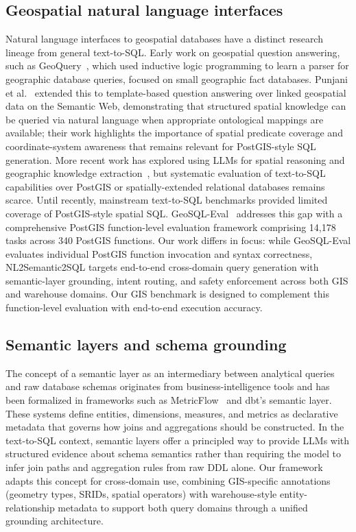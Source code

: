 \documentclass[11pt]{article}
\begin{document}
\subsection{Geospatial natural language interfaces}

Natural language interfaces to geospatial databases have a distinct research lineage from general text-to-SQL. Early work on geospatial question answering, such as GeoQuery~\cite{zelle1996geoquery}, which used inductive logic programming to learn a parser for geographic database queries, focused on small geographic fact databases. Punjani et al.~\cite{punjani2018geospatial} extended this to template-based question answering over linked geospatial data on the Semantic Web, demonstrating that structured spatial knowledge can be queried via natural language when appropriate ontological mappings are available; their work highlights the importance of spatial predicate coverage and coordinate-system awareness that remains relevant for PostGIS-style SQL generation. More recent work has explored using LLMs for spatial reasoning and geographic knowledge extraction~\cite{mai2024foundation}, but systematic evaluation of text-to-SQL capabilities over PostGIS or spatially-extended relational databases remains scarce. Until recently, mainstream text-to-SQL benchmarks provided limited coverage of PostGIS-style spatial SQL. GeoSQL-Eval~\cite{hou2025geosql} addresses this gap with a comprehensive PostGIS function-level evaluation framework comprising 14,178 tasks across 340 PostGIS functions. Our work differs in focus: while GeoSQL-Eval evaluates individual PostGIS function invocation and syntax correctness, NL2Semantic2SQL targets end-to-end cross-domain query generation with semantic-layer grounding, intent routing, and safety enforcement across both GIS and warehouse domains. Our GIS benchmark is designed to complement this function-level evaluation with end-to-end execution accuracy.

\subsection{Semantic layers and schema grounding}

The concept of a semantic layer as an intermediary between analytical queries and raw database schemas originates from business-intelligence tools and has been formalized in frameworks such as MetricFlow~\cite{metricflow} and dbt's semantic layer. These systems define entities, dimensions, measures, and metrics as declarative metadata that governs how joins and aggregations should be constructed. In the text-to-SQL context, semantic layers offer a principled way to provide LLMs with structured evidence about schema semantics rather than requiring the model to infer join paths and aggregation rules from raw DDL alone. Our framework adapts this concept for cross-domain use, combining GIS-specific annotations (geometry types, SRIDs, spatial operators) with warehouse-style entity-relationship metadata to support both query domains through a unified grounding architecture.
\end{document}
